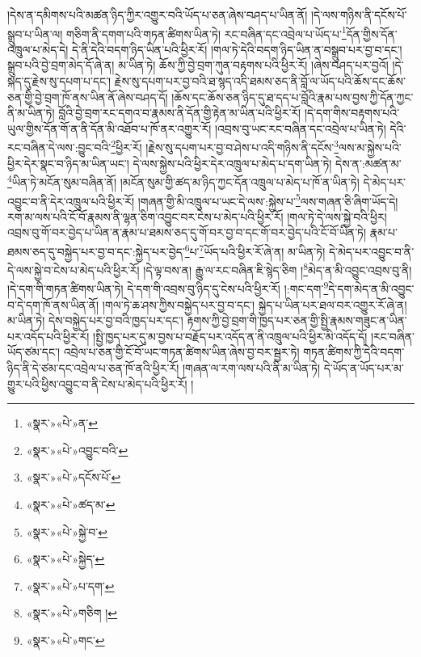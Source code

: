 །དེས་ན་དམིགས་པའི་མཚན་ཉིད་ཀྱིར་འགྱུར་བའི་ཡོད་པ་ཅན་ཞེས་བཤད་པ་ཡིན་ནོ། །དེ་ལས་གཉིས་ནི་དངོས་པོ་སྒྲུབ་པ་ཡིན་ལ། གཅིག་ནི་དགག་པའི་གཏན་ཚིགས་ཡིན་ཏེ། རང་བཞིན་དང་འབྲེལ་པ་ཡོད་པ་\footnote{«སྣར་»«པེ་»ན་}དོན་གྱིས་དོན་འཁྲུལ་པ་མེད་དེ། དེ་ནི་དེའི་བདག་ཉིད་ཡིན་པའི་ཕྱིར་རོ། །གལ་ཏེ་དེའི་བདག་ཉིད་ཡིན་ན་བསྒྲུབ་པར་བྱ་བ་དང་། སྒྲུབ་པའི་བྱེ་བྲག་མེད་དོ་ཞེ་ན། མ་ཡིན་ཏེ། ཆོས་ཀྱི་བྱེ་བྲག་ཀུན་བརྟགས་པའི་ཕྱིར་རོ། །ཞེས་བཤད་པར་བྱའོ། །དེ་སྐད་དུ་རྗེས་སུ་དཔག་པ་དང་། རྗེས་སུ་དཔག་པར་བྱ་བའི་ཐ་སྙད་འདི་ཐམས་ཅད་ནི་བློ་ལ་ཡོད་པའི་ཆོས་དང་ཆོས་ཅན་གྱི་བྱེ་བྲག་ཁོ་ནས་ཡིན་ནོ་ཞེས་བཤད་དོ། །ཆོས་དང་ཆོས་ཅན་ཉིད་དུ་ཐ་དད་པ་བློའི་རྣམ་པས་བྱས་ཀྱི་དོན་ཀྱང་ནི་མ་ཡིན་ཏེ། བློའི་བྱེ་བྲག་རང་དགའ་བ་རྣམས་ནི་དོན་གྱི་རྟེན་མ་ཡིན་པའི་ཕྱིར་རོ། །དེ་དག་གིས་བརྟགས་པའི་ཡུལ་གྱིས་དོན་གོ་ན་ནི་དོན་མི་འཐོབ་པ་ཁོ་ནར་འགྱུར་རོ། །འབྲས་བུ་ཡང་རང་བཞིན་དང་འབྲེལ་པ་ཡིན་ཏེ། དེའི་རང་བཞིན་དེ་ལས་:བྱུང་བའི་\footnote{«སྣར་»«པེ་»འབྱུང་བའི་}ཕྱིར་རོ། །རྗེས་སུ་དཔག་པར་བྱ་བ་ཤེས་པ་འདི་གཉིས་ནི་དངོས་\footnote{«སྣར་»«པེ་»དངོས་པོ་}ལས་མ་སྐྱེས་པའི་ཕྱིར་དེར་སྣང་བ་ཉིད་མ་ཡིན་ཡང་། དེ་ལས་སྐྱེས་པའི་ཕྱིར་དེར་འཁྲུལ་པ་མེད་པ་དག་ཡིན་ཏེ། དེས་ན་:མཚན་མ་\footnote{«སྣར་»«པེ་»ཚད་མ་}ཡིན་ཏེ་མངོན་སུམ་བཞིན་ནོ། །མངོན་སུམ་གྱི་ཚད་མ་ཉིད་ཀྱང་དོན་འཁྲུལ་པ་མེད་པ་ཁོ་ན་ཡིན་ཏེ། དེ་མེད་པར་འབྱུང་བ་ནི་དེར་འཁྲུལ་པའི་ཕྱིར་རོ། །གཞན་གྱི་མི་འཁྲུལ་པ་ཡང་དེ་ལས་:སྐྱེས་པ་\footnote{«སྣར་»«པེ་»སྐྱེ་བ་}ལས་གཞན་ཅི་ཞིག་ཡོད་དེ། རག་མ་ལས་པའི་ངོ་བོ་རྣམས་ནི་ལྷན་ཅིག་འབྱུང་བར་ངེས་པ་མེད་པའི་ཕྱིར་རོ། །གལ་ཏེ་དེ་ལས་སྐྱེ་བའི་ཕྱིར། འབྲས་བུ་གོ་བར་བྱེད་པ་ཡིན་ན་རྣམ་པ་ཐམས་ཅད་དུ་གོ་བར་བྱ་བ་དང་གོ་བར་བྱེད་པའི་ངོ་བོ་ཡིན་ཏེ། རྣམ་པ་ཐམས་ཅད་དུ་བསྐྱེད་པར་བྱ་བ་དང་:སྐྱེད་པར་བྱེད་\footnote{«སྣར་»«པེ་»སྐྱེད་}པ་\footnote{«སྣར་»«པེ་»པ་དག་}ཡོད་པའི་ཕྱིར་རོ་ཞེ་ན། མ་ཡིན་ཏེ། དེ་མེད་པར་འབྱུང་བ་ནི་དེ་ལས་སྐྱེ་བ་ངེས་པ་མེད་པའི་ཕྱིར་རོ། །དེ་ལྟ་བས་ན། རྒྱུ་ལ་རང་བཞིན་ཇི་སྙེད་ཅིག །\footnote{«སྣར་»«པེ་»གཅིག །}མེད་ན་མི་འབྱུང་འབྲས་བུ་ནི། །དེ་དག་གི་གཏན་ཚིགས་ཡིན་ཏེ། དེ་དག་གི་འབྲས་བུ་ཉིད་དུ་ངེས་པའི་ཕྱིར་རོ། །:གང་དག་\footnote{«སྣར་»«པེ་»གང་}དེ་དག་མེད་ན་མི་འབྱུང་བ་དེ་དག་ཁོ་ནས་ཡིན་ནོ། །གལ་ཏེ་ཆ་ཤས་ཀྱིས་བསྐྱེད་པར་བྱ་བ་དང་། སྐྱེད་པ་ཡིན་པར་ཐལ་བར་འགྱུར་རོ་ཞེ་ན། མ་ཡིན་ཏེ། དེས་བསྐྱེད་པར་བྱ་བའི་ཁྱད་པར་དང་། རྟགས་ཀྱི་བྱེ་བྲག་གི་ཁྱད་པར་ཅན་གྱི་སྤྱི་རྣམས་གཟུང་ན་ཡིན་པར་འདོད་པའི་ཕྱིར་རོ། །སྤྱི་ཁྱད་པར་དུ་མ་བྱས་པ་བརྗོད་པར་འདོད་ན་ནི་འཁྲུལ་པའི་ཕྱིར་མི་འདོད་དོ། །རང་བཞིན་ཡོད་ཙམ་དང་། འབྲེལ་པ་ཅན་གྱི་ངོ་བོ་ཡང་གཏན་ཚིགས་ཡིན་ཞེས་བྱ་བར་སྦྱར་ཏེ། གཏན་ཚིགས་ཀྱི་དེའི་བདག་ཉིད་ནི་དེ་ཙམ་དང་འབྲེལ་པ་ཅན་ཁོ་ནའི་ཕྱིར་རོ། །གཞན་ལ་རག་ལས་པའི་ནི་མ་ཡིན་ཏེ། དེ་ཡོད་ན་ཡོད་པར་མ་གྱུར་པའི་ཕྱིས་འབྱུང་བ་ནི་ངེས་པ་མེད་པའི་ཕྱིར་རོ། །
